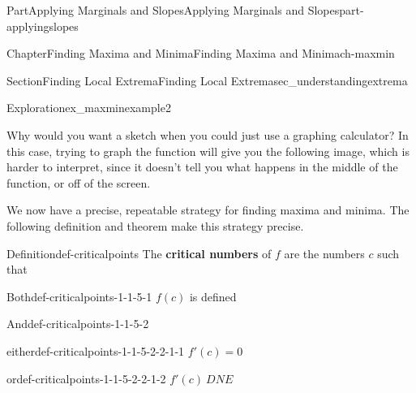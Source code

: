 \documentclass[oneside,10pt,]{tufte-book}
\newcommand{\terminology}[1]{\textbf{#1}}
\numberwithin{equation}{chapter}
\begin{document}
\begin{partptx}{Part}{Applying Marginals and Slopes}{}{Applying Marginals and Slopes}{}{}{part-applyingslopes}
\begin{chapterptx}{Chapter}{Finding Maxima and Minima}{}{Finding Maxima and Minima}{}{}{ch-maxmin}
\begin{sectionptx}{Section}{Finding Local Extrema}{}{Finding Local Extrema}{}{}{sec_understandingextrema}
\begin{exploration}{Exploration}{}{ex_maxminexample2}
\begin{enumerate}[font=\bfseries,label=(\alph*),ref=\alph*]
\begin{image}{0.25}{0.5}{0.25}{}
{
}%
\end{image}%
%
\par
Why would you want a sketch when you could just use a graphing calculator? In this case, trying to graph the function will give you the following image, which is harder to interpret, since it doesn't tell you what happens in the middle of the function, or off of the screen. \begin{image}{0}{1}{0}{}%
%
\end{image}%
%
\end{enumerate}%
\end{exploration}%
We now have a precise, repeatable strategy for finding maxima and minima. The following definition and theorem make this strategy precise.%
\begin{definition}{Definition}{}{def-criticalpoints}%
The \terminology{critical numbers} of \(f\) are the numbers \(c\) such that \(\)%
\begin{descriptionlist}
\begin{dlimedium}{Both}{def-criticalpoints-1-1-5-1}%
\(f(c)\) is defined%
\end{dlimedium}%
\begin{dlimedium}{And}{def-criticalpoints-1-1-5-2}%
%
\begin{descriptionlist}
\begin{dlimedium}{either}{def-criticalpoints-1-1-5-2-2-1-1}%
 \(f'(c) = 0\)\end{dlimedium}%
\begin{dlimedium}{or}{def-criticalpoints-1-1-5-2-2-1-2}%
 \(f'(c)\ DNE\)\end{dlimedium}%
\end{descriptionlist}

\end{dlimedium}
\end{descriptionlist}
\end{definition}
\end{sectionptx}
\end{chapterptx}
\end{partptx}
\end{document}
